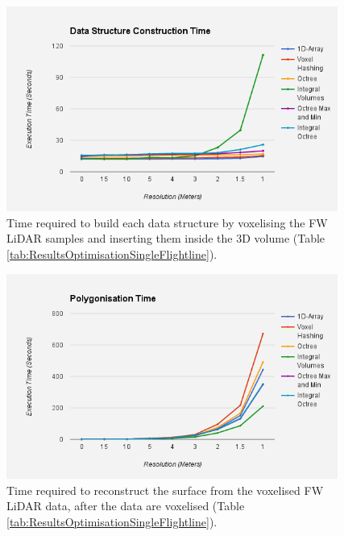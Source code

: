 \documentclass{subfiles}
\begin{document}
\begin{figure}[!htbp]
	\centering
	\includegraphics[width=0.97\textwidth]{img/opt/ConstructionTime}
	\caption{Time required to build each data structure by voxelising the FW LiDAR samples and inserting them inside the 3D volume (Table \ref{tab:ResultsOptimisationSingleFlightline}).}
	\label{fig:ConTime}
\end{figure}

\begin{figure}[!htbp]
	\centering
	\includegraphics[width=0.97\textwidth]{img/opt/PolygonisationTime}
	\caption{Time required to reconstruct the surface from the voxelised FW LiDAR data, after the data are voxelised (Table \ref{tab:ResultsOptimisationSingleFlightline}).}
	\label{fig:PolTime}
\end{figure}
\end{document}
